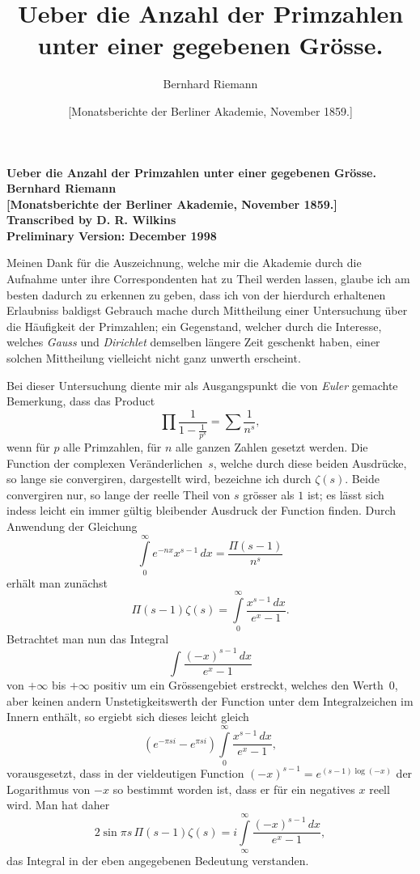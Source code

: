 \documentclass[a4paper,12pt]{article}
\begin{document}
\thispagestyle{empty}
\begin{center}
\Large\bfseries
Ueber die Anzahl der Primzahlen unter einer gegebenen Gr\"{o}sse.\\[12 pt]
Bernhard Riemann\\[12 pt]
[Monatsberichte der Berliner Akademie, November 1859.]\\[24 pt]
\large\mdseries
Transcribed by D. R. Wilkins\\[12 pt]
Preliminary Version: December 1998
\end{center}

\newpage
\setcounter{page}{1}


\title{Ueber die Anzahl der Primzahlen unter einer gegebenen Gr\"{o}sse.}
\author{Bernhard Riemann}
\date{[Monatsberichte der Berliner Akademie, November 1859.]}

\maketitle

Meinen Dank f\"{u}r die Auszeichnung, welche mir die Akademie
durch die Aufnahme unter ihre Correspondenten hat zu Theil werden
lassen, glaube ich am besten dadurch zu erkennen zu geben, dass ich
von der hierdurch erhaltenen Erlaubniss baldigst Gebrauch mache durch
Mittheilung einer Untersuchung \"{u}ber die H\"{a}ufigkeit der
Primzahlen; ein Gegenstand, welcher durch die Interesse, welches
\emph{Gauss} und \emph{Dirichlet} demselben l\"{a}ngere Zeit
geschenkt haben, einer solchen Mittheilung vielleicht nicht ganz
unwerth erscheint.

Bei dieser Untersuchung diente mir als Ausgangspunkt die von
\emph{Euler} gemachte Bemerkung, dass das Product
\[ \prod \frac{1}{\displaystyle 1 - \frac{1}{p^s}}
   = {\textstyle\sum} \frac{1}{n^s},\]
wenn f\"{u}r $p$ alle Primzahlen, f\"{u}r $n$ alle ganzen Zahlen
gesetzt werden.  Die Function der complexen Ver\"{a}nderlichen~$s$,
welche durch diese beiden Ausdr\"{u}cke, so lange sie convergiren,
dargestellt wird, bezeichne ich durch $\zeta(s)$.  Beide convergiren
nur, so lange der reelle Theil von $s$ gr\"{o}sser als $1$ ist; es
l\"{a}sst sich indess leicht ein immer g\"{u}ltig bleibender Ausdruck
der Function finden.  Durch Anwendung der Gleichung
\[ \int\limits_0^\infty e^{-nx} x^{s-1} \,dx = \frac{\Pi(s - 1)}{n^s} \]
erh\"{a}lt man zun\"{a}chst
\[ \Pi(s - 1) \zeta(s) = \int\limits_0^\infty \frac{x^{s-1}\,dx}{e^x - 1}.\]
Betrachtet man nun das Integral
\[ \int\limits \frac{(-x)^{s-1} \,dx}{e^x - 1} \]
von $+\infty$ bis $+\infty$ positiv um ein Gr\"{o}ssengebiet erstreckt,
welches den Werth~$0$, aber keinen andern Unstetigkeitswerth der
Function unter dem Integralzeichen im Innern enth\"{a}lt, so ergiebt
sich dieses leicht gleich
\[ (e^{-\pi si} - e^{\pi si})
      \int\limits_0^\infty \frac{x^{s-1}\,dx}{e^x - 1},\]
vorausgesetzt, dass in der vieldeutigen Function
$(-x)^{s-1} = e^{(s-1)\log(-x)}$
der Logarithmus von $-x$ so bestimmt worden ist, dass er f\"{u}r ein
negatives $x$ reell wird.  Man hat daher
\[ 2 \sin \pi s \, \Pi(s - 1) \zeta(s)
   = i \int\limits_\infty^\infty \frac{(-x)^{s-1} \,dx}{e^x - 1},\]
das Integral in der eben angegebenen Bedeutung verstanden.
\end{document}
